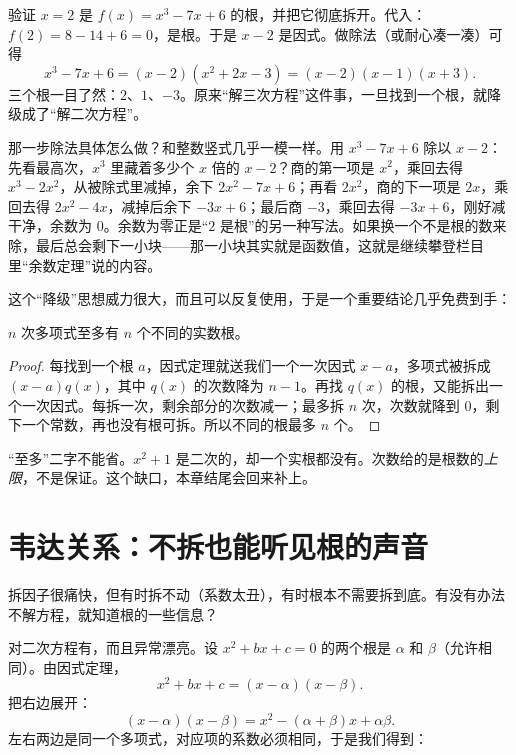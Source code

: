 \begin{li}
验证 $x=2$ 是 $f(x)=x^3-7x+6$ 的根，并把它彻底拆开。代入：$f(2)=8-14+6=0$，是根。于是 $x-2$ 是因式。做除法（或耐心凑一凑）可得
\[
x^3-7x+6 = (x-2)(x^2+2x-3) = (x-2)(x-1)(x+3).
\]
三个根一目了然：$2$、$1$、$-3$。原来“解三次方程”这件事，一旦找到一个根，就降级成了“解二次方程”。
\end{li}

那一步除法具体怎么做？和整数竖式几乎一模一样。用 $x^3-7x+6$ 除以 $x-2$：先看最高次，$x^3$ 里藏着多少个 $x$ 倍的 $x-2$？商的第一项是 $x^2$，乘回去得 $x^3-2x^2$，从被除式里减掉，余下 $2x^2-7x+6$；再看 $2x^2$，商的下一项是 $2x$，乘回去得 $2x^2-4x$，减掉后余下 $-3x+6$；最后商 $-3$，乘回去得 $-3x+6$，刚好减干净，余数为 $0$。余数为零正是“$2$ 是根”的另一种写法。如果换一个不是根的数来除，最后总会剩下一小块——那一小块其实就是函数值，这就是继续攀登栏目里“余数定理”说的内容。

这个“降级”思想威力很大，而且可以反复使用，于是一个重要结论几乎免费到手：

\begin{tuilun}
$n$ 次多项式至多有 $n$ 个不同的实数根。
\end{tuilun}

\begin{proof}
每找到一个根 $a$，因式定理就送我们一个一次因式 $x-a$，多项式被拆成 $(x-a)q(x)$，其中 $q(x)$ 的次数降为 $n-1$。再找 $q(x)$ 的根，又能拆出一个一次因式。每拆一次，剩余部分的次数减一；最多拆 $n$ 次，次数就降到 $0$，剩下一个常数，再也没有根可拆。所以不同的根最多 $n$ 个。
\end{proof}

\begin{zhu}
“至多”二字不能省。$x^2+1$ 是二次的，却一个实根都没有。次数给的是根数的\emph{上限}，不是保证。这个缺口，本章结尾会回来补上。
\end{zhu}

\section{韦达关系：不拆也能听见根的声音}

拆因子很痛快，但有时拆不动（系数太丑），有时根本不需要拆到底。有没有办法不解方程，就知道根的一些信息？

对二次方程有，而且异常漂亮。设 $x^2+bx+c=0$ 的两个根是 $\alpha$ 和 $\beta$（允许相同）。由因式定理，
\[
x^2+bx+c = (x-\alpha)(x-\beta).
\]
把右边展开：
\[
(x-\alpha)(x-\beta) = x^2 - (\alpha+\beta)x + \alpha\beta.
\]
左右两边是同一个多项式，对应项的系数必须相同，于是我们得到：


